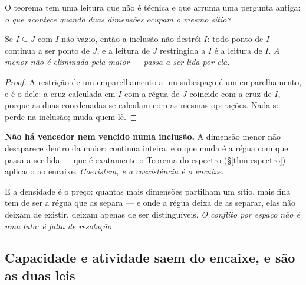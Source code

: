 \documentclass[livro.tex]{subfiles}
\begin{document}
\noindent O teorema tem uma leitura que não é técnica e que arruma uma pergunta antiga: \emph{o que
acontece quando duas dimensões ocupam o mesmo sítio?}

\begin{teorema}\label{thm:coexistem}
Se $I\subseteq J$ com $I$ não vazio, então a inclusão não destrói $I$: todo ponto de $I$ continua a
ser ponto de $J$, e a leitura de $J$ restringida a $I$ é a leitura de $I$. \emph{A menor não é
eliminada pela maior --- passa a ser lida por ela.}
\end{teorema}

\begin{proof}
A restrição de um emparelhamento a um subespaço é um emparelhamento, e é o dele: a cruz calculada
em $I$ com a régua de $J$ coincide com a cruz de $I$, porque as duas coordenadas se calculam com
as mesmas operações. Nada se perde na inclusão; muda quem lê.
\end{proof}


\noindent \textbf{Não há vencedor nem vencido numa inclusão.} A dimensão menor não desaparece
dentro da maior: continua inteira, e o que muda é a régua com que passa a ser lida --- que é
exatamente o Teorema do espectro (\S\ref{thm:espectro}) aplicado ao encaixe. \emph{Coexistem, e a
coexistência é o encaixe.}

\medskip
\noindent E a densidade é o preço: quantas mais dimensões partilham um sítio, mais fina tem de ser
a régua que as separa --- e onde a régua deixa de as separar, elas não deixam de existir, deixam
apenas de ser distinguíveis. \emph{O conflito por espaço não é uma luta: é falta de resolução.}




\subsection{Capacidade e atividade saem do encaixe, e são as duas leis}\label{sec:entropia}
\end{document}
